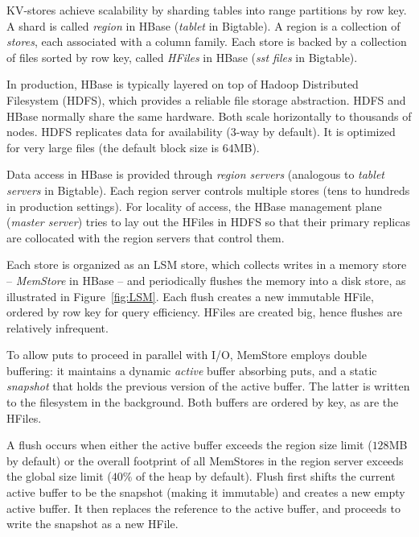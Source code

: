 KV-stores achieve scalability by sharding tables into range partitions by row key. 
A shard is called {\em region\/} in HBase (\emph{tablet} in Bigtable). 
A region is a collection of \emph{stores}, each associated with a column family. 
Each store is backed by a collection of files sorted by row key, called \emph{HFiles} in HBase 
(\emph{sst files} in Bigtable). 

In production, HBase is typically layered on top of Hadoop Distributed Filesystem (HDFS), 
which provides a reliable file storage abstraction. HDFS and HBase normally share the same hardware. 
Both scale horizontally to thousands of nodes. HDFS replicates data for availability (3-way by default). 
It is optimized for very large files (the default block size is $64$MB).

Data access in HBase is provided through {\em region servers} (analogous to {\em tablet servers}
in Bigtable). Each region server controls multiple stores (tens to hundreds in production settings). 
For locality of access, the HBase management plane (\emph{master server}) tries to lay out the 
HFiles in HDFS so that their primary replicas are collocated with the region servers that control them. 

Each store is organized as an LSM store, which collects writes in a memory store --
\emph{MemStore} in HBase -- and periodically flushes the memory into a disk store, as illustrated in 
Figure~\ref{fig:LSM}. Each flush creates a new immutable HFile, ordered by row key for query efficiency. 
HFiles are created big, hence flushes are relatively infrequent. 

To allow puts to proceed in parallel with I/O, MemStore employs double buffering:
it maintains a dynamic \emph{active} buffer absorbing puts, and a static \emph{snapshot}
that holds the previous version of the active buffer. The latter is written to the 
filesystem in the background. Both buffers are ordered by key, as are the HFiles.  

A flush occurs  when either the active buffer 
exceeds the region size limit ($128$MB by default) or  the overall footprint of all MemStores
in the region server exceeds the global size limit ($40\%$ of the heap by default). 
Flush first shifts the current active buffer to be the snapshot (making it immutable) and creates a new empty active buffer.
It then replaces the reference to the active buffer, and proceeds to write the snapshot as a new HFile. 

